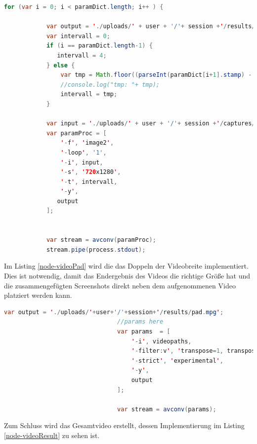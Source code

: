 \begin{lstlisting}[label=node-imgToVideo,language=Java, caption=Erstellung der Videos aus Screenshots]
for (var i = 0; i < paramDict.length; i++ ) {

            var output = './uploads/' + user + '/'+ session +'/results/captures/'+ (i+1)+'.mpg';
            var intervall = 0;
            if (i == paramDict.length-1) {
               intervall = 4;
            } else {
                var tmp = Math.floor((parseInt(paramDict[i+1].stamp) - parseInt(paramDict[i].stamp)) / 1000);
                //console.log("tmp: "+ tmp);
                intervall = tmp;
            }

            var input = './uploads/' + user + '/'+ session +'/captures/' + paramDict[i].filename;
            var paramProc = [
                '-f', 'image2',
                '-loop', '1',
                '-i', input,
                '-s', '720x1280',
                '-t', intervall,
                '-y',
               output
            ];


            var stream = avconv(paramProc);
            stream.pipe(process.stdout);
\end{lstlisting}

Im Listing \ref{node-videoPad} wird die das Doppeln der Videobreite implementiert. Dies ist notwendig, damit das Endergebnis des Videos die richtige Größe hat und die zusammengefügten Screenshots direkt neben dem aufgenommenen Video platziert werden kann.

\begin{lstlisting}[label=node-videoPad,language=Java, caption=Erstellung der Ergebnisgrundlage]
var output = './uploads/'+user+'/'+session+'/results/pad.mpg';
                                //params here
                                var params  = [
                                    '-i', videopaths,
                                    '-filter:v', 'transpose=1, transpose=1, transpose=1, pad=2*iw',
                                    '-strict', 'experimental',
                                    '-y',
                                    output
                                ];

                                var stream = avconv(params);
\end{lstlisting}

Zum Schluss wird das Gesamtvideo erstellt, dessen Implementierung im Listing \ref{node-videoResult} zu sehen ist. 


